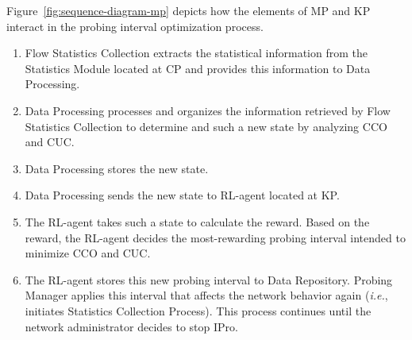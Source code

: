 Figure~\ref{fig:sequence-diagram-mp} depicts how the elements of MP and KP interact in the probing interval optimization process.

\begin{enumerate}[label=\protect\circled{\arabic*}]
    \item Flow Statistics Collection extracts the statistical information from the Statistics Module located at CP and provides this information to Data Processing.
    \item Data Processing processes and organizes the information retrieved by Flow Statistics Collection to determine and such a new state by analyzing CCO and CUC.
    \item Data Processing stores the new state.
    \item Data Processing sends the new state to RL-agent located at KP.
    \item The RL-agent takes such a state to calculate the reward. Based on the reward, the RL-agent decides the most-rewarding probing interval intended to minimize CCO and CUC.
    \item The RL-agent stores this new probing interval to Data Repository. Probing Manager applies this interval that affects the network behavior again (\textit{i.e.}, initiates Statistics Collection Process). This process continues until the network administrator decides to stop IPro.
\end{enumerate}
